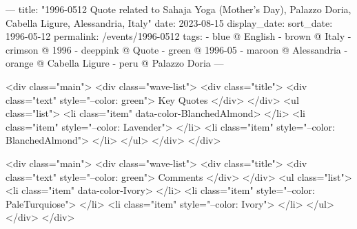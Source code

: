 ---
title: "1996-0512 Quote related to Sahaja Yoga (Mother's Day), Palazzo Doria, Cabella Ligure, Alessandria, Italy"
date: 2023-08-15
display_date: 
sort_date: 1996-05-12
permalink: /events/1996-0512
tags:
  - blue @ English
  - brown @ Italy
  - crimson @ 1996
  - deeppink @ Quote
  - green @ 1996-05
  - maroon @ Alessandria
  - orange @ Cabella Ligure
  - peru @ Palazzo Doria
---

<div class="main">
  <div class="wave-list">
    <div class="title">
      <div class="text" style="--color: green">
        Key Quotes
      </div>
    </div>
    <ul class="list">
        <li class="item" data-color-BlanchedAlmond>
        </li>
        <li class="item" style="--color: Lavender">
        </li>
        <li class="item" style="--color: BlanchedAlmond">
        </li>
      </ul>
  </div>
</div>

<div class="main">
  <div class="wave-list">
    <div class="title">
      <div class="text" style="--color: green">
        Comments
      </div>
    </div>
    <ul class="list">
        <li class="item" data-color-Ivory>
        </li>
        <li class="item" style="--color: PaleTurquiose">
        </li>
        <li class="item" style="--color: Ivory">
        </li>
      </ul>
  </div>
</div>